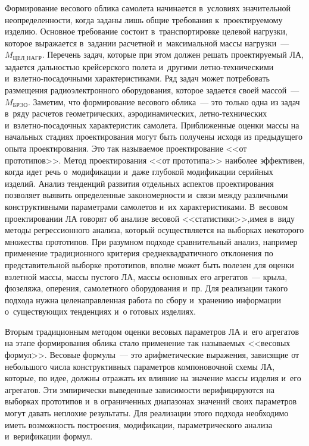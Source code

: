 \begin{multicols}{2}
  Формирование весового облика самолета начинается в~условиях 
значительной неопределенности, когда заданы лишь общие требования 
к~проектируемому изделию. Основное требование состоит в~транспортировке 
целевой нагрузки, которое выражается в~задании расчетной и~максимальной 
массы нагрузки~--- $M_{\mathrm{ЦЕЛ\_НАГР}}$. Перечень задач, которые при этом 
должен решать проектируемый ЛА, задается дальностью крейсерского полета 
и~другими лет\-но-тех\-ни\-че\-ски\-ми и~взлет\-но-по\-са\-доч\-ны\-ми характеристиками. Ряд 
задач может потребовать размещения радиоэлектронного оборудования, 
которое задается своей массой~--- $ M_{\mathrm{БРЭО}}$. Заметим, что 
формирование весового облика~--- это только одна из задач в~ряду расчетов 
геометрических, аэродинамических, лет\-но-тех\-ни\-че\-ских 
и~взлет\-но-по\-са\-доч\-ных характеристик самолета. Приближенные оценки 
массы на начальных стадиях проектирования могут быть получены исходя из 
предыдущего опыта проектирования. Это так называемое проектирование <<от 
прототипов>>. Метод проектирования <<от прототипа>> наиболее эффективен, 
когда идет речь о~модификации и~даже глубокой модификации серийных 
изделий. Анализ тенденций развития отдельных аспектов проектирования 
позволяет выявить определенные закономерности и~связи между различными 
конструктивными параметрами самолетов и~их характеристиками. В~весовом 
проектировании ЛА говорят об анализе весовой <<статистики>>,\linebreak имея в~виду 
методы регрессионного анализа, который осуществляется на выборках 
некоторого множества прототипов. При разумном подходе сравнительный 
анализ, например применение \mbox{традиционного} критерия среднеквадратичного 
отклонения по представительной выборке прототипов, вполне может быть 
полезен для оценки взлетной массы, массы пустого ЛА, массы основных его 
агрегатов~--- крыла, фюзеляжа, оперения, самолетного оборудования и~пр. Для 
реализации такого подхода нужна целенаправленная работа по сбору 
и~хранению информации о~существующих тенденциях и~о готовых изделиях. 
  
  Вторым традиционным методом оценки весовых параметров ЛА и~его 
агрегатов на этапе формирования облика стало применение так называемых 
<<весовых формул>>. Весовые формулы~--- это арифметические выражения, 
зависящие от небольшого числа конструктивных параметров компоновочной 
схемы ЛА, которые, по идее, должны отражать их влияние на значение массы 
изделия и~его агрегатов. Эти эмпирически выведенные зависимости 
верифицируются на выборках прототипов и~в ограниченных диапазонах 
значений своих параметров могут давать неплохие результаты. Для реализации 
этого подхода необходимо иметь возможность построения, модификации, 
параметрического анализа и~верификации формул.
  

\end{multicols}
